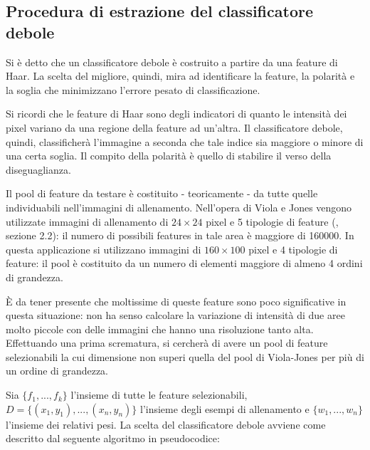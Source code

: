         \subsection{Procedura di estrazione del classificatore debole}
            Si è detto che un classificatore debole è costruito a partire da una feature di Haar. La scelta del migliore, quindi, mira ad identificare la feature, la polarità e la soglia che minimizzano l'errore pesato di classificazione.

            Si ricordi che le feature di Haar sono degli indicatori di quanto le intensità dei pixel variano da una regione della feature ad un'altra. Il classificatore debole, quindi, classificherà l'immagine a seconda che tale indice sia maggiore o minore di una certa soglia. Il compito della polarità è quello di stabilire il verso della diseguaglianza.

            Il pool di feature da testare è costituito - teoricamente - da tutte quelle individuabili nell'immagini di allenamento. Nell'opera di Viola e Jones vengono utilizzate immagini di allenamento di $24 \times 24$ pixel e 5 tipologie di feature (\cite{Viola04}, sezione 2.2): il numero di possibili features in tale area è maggiore di 160000. In questa applicazione si utilizzano immagini di $160 \times 100$ pixel e 4 tipologie di feature: il pool è costituito da un numero di elementi maggiore di almeno 4 ordini di grandezza.

            È da tener presente che moltissime di queste feature sono poco significative in questa situazione: non ha senso calcolare la variazione di intensità di due aree molto piccole con delle immagini che hanno una risoluzione tanto alta. Effettuando una prima scrematura, si cercherà di avere un pool di feature selezionabili la cui dimensione non superi quella del pool di Viola-Jones per più di un ordine di grandezza.

            Sia $\{ f_1,...,f_k\}$ l'insieme di tutte le feature selezionabili, $D = \{(x_1,y_1), ..., (x_n, y_n) \}$ l'insieme degli esempi di allenamento e $\{w_1, ..., w_n\}$ l'insieme dei relativi pesi. La scelta del classificatore debole avviene come descritto dal seguente algoritmo in pseudocodice:

